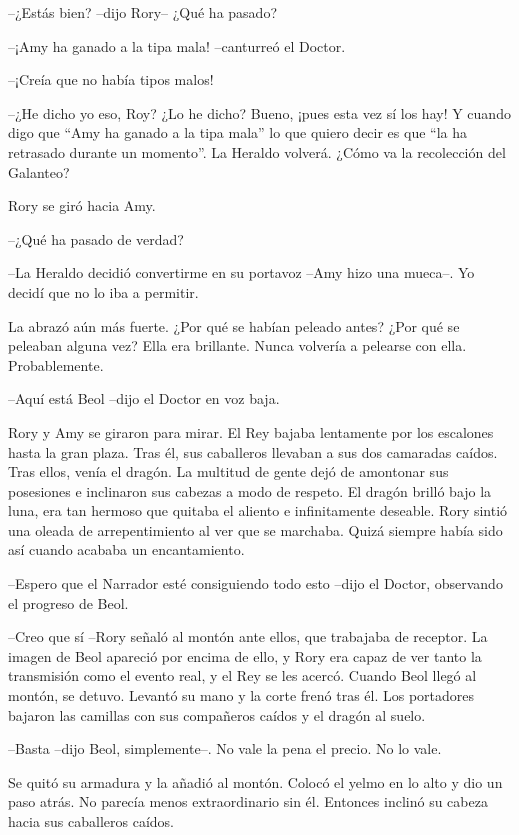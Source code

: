 {--¿Estás bien? --dijo Rory-- ¿Qué ha pasado?}

{--¡Amy ha ganado a la tipa mala! --canturreó el Doctor.}

{--¡Creía que no había tipos malos!}

{--¿He dicho yo eso, Roy? ¿Lo he dicho? Bueno, ¡pues esta vez sí los
	hay! Y cuando digo que ``Amy ha ganado a la tipa mala'' lo que quiero
	decir es que ``la ha retrasado durante un momento''. La Heraldo volverá.
¿Cómo va la recolección del Galanteo?}

{Rory se giró hacia Amy.}

{--¿Qué ha pasado de verdad?}

{--La Heraldo decidió convertirme en su portavoz --Amy hizo una
mueca--. Yo decidí que no lo iba a permitir.}

{La abrazó aún más fuerte. ¿Por qué se habían peleado antes? ¿Por qué se
	peleaban alguna vez? Ella era brillante. Nunca volvería a pelearse con
ella. Probablemente.}

{--Aquí está Beol --dijo el Doctor en voz baja.}

{Rory y Amy se giraron para mirar. El Rey bajaba lentamente por los
	escalones hasta la gran plaza. Tras él, sus caballeros llevaban a sus
	dos camaradas caídos. Tras ellos, venía el dragón. La multitud de gente
	dejó de amontonar sus posesiones e inclinaron sus cabezas a modo de
	respeto. El dragón brilló bajo la luna, era tan hermoso que quitaba el
	aliento e infinitamente deseable. Rory sintió una oleada de
	arrepentimiento al ver que se marchaba. Quizá siempre había sido así
cuando acababa un encantamiento.}

{--Espero que el Narrador esté consiguiendo todo esto --dijo el
Doctor, observando el progreso de Beol.}

{--Creo que sí --Rory señaló al montón ante ellos, que trabajaba de
	receptor. La imagen de Beol apareció por encima de ello, y Rory era
	capaz de ver tanto la transmisión como el evento real, y el Rey se les
	acercó. Cuando Beol llegó al montón, se detuvo. Levantó su mano y la
	corte frenó tras él. Los portadores bajaron las camillas con sus
compañeros caídos y el dragón al suelo.}

{--Basta --dijo Beol, simplemente--. No vale la pena el precio. No lo
vale.}

{Se quitó su armadura y la añadió al montón. Colocó el yelmo en lo alto
	y dio un paso atrás. No parecía menos extraordinario sin él. Entonces
inclinó su cabeza hacia sus caballeros caídos.}

